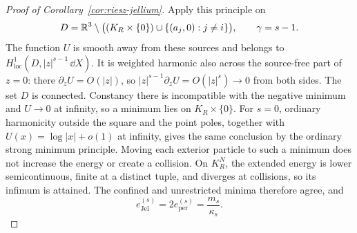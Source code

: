 \begin{proof}[Proof of Corollary~\ref{cor:riesz-jellium}]
Apply this principle on
\[
 D=\mathbb R^3\setminus\bigl((K_R\times\{0\})
                    \cup\{(a_j,0):j\ne i\}\bigr),
 \qquad \gamma=s-1 .
\]
The function $U$ is smooth away from these sources and belongs to
$H^1_{\mathrm{loc}}(D,|z|^{s-1}\,\dd X)$.
It is weighted harmonic also across the source-free part of $z=0$:
there $\partial_zU=O(|z|)$, so
$|z|^{s-1}\partial_zU=O(|z|^s)\to0$ from both sides.
The set $D$ is connected.  Constancy there is incompatible with
the negative minimum and $U\to0$ at infinity, so a minimum lies
on $K_R\times\{0\}$.
For $s=0$, ordinary harmonicity outside the square and the point
poles, together with $U(x)=\log|x|+o(1)$ at infinity, gives the same
conclusion by the ordinary strong minimum principle.
Moving each exterior particle to such a minimum does not increase
the energy or create a collision.  On $K_R^N$, the extended energy is
lower semicontinuous, finite at a distinct tuple, and diverges at
collisions, so its infimum is attained.  The confined and unrestricted
minima therefore agree, and
\[
 e_{\mathrm{Jel}}^{(s)}
 =2e_{\mathrm{per}}^{(s)}
 =\frac{m_s}{\kappa_s}.
\]
\end{proof}
